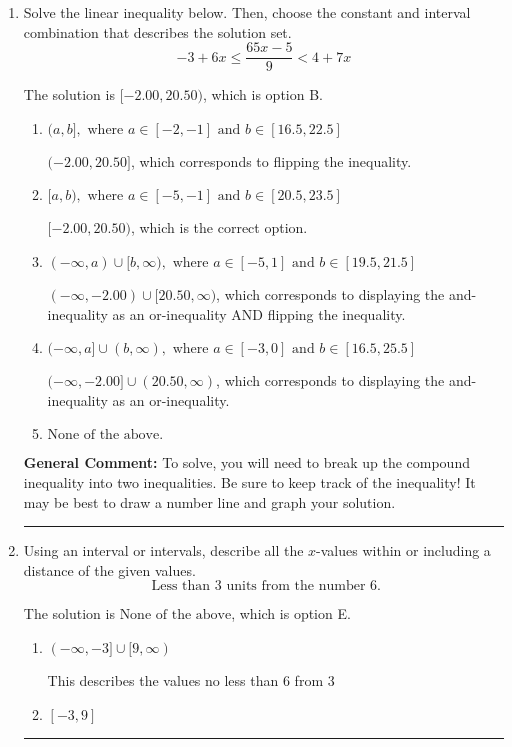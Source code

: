\documentclass{extbook}[14pt]
\newcommand{\litem}[1]{\item #1

\rule{\textwidth}{0.4pt}}
\begin{document}
\begin{enumerate}
{\begin{enumerate}[label=\Alph*.]
Corresponds to the variable canceling, which does not happen in this instance.
\end{enumerate}

\textbf{General Comment:} When multiplying or dividing by a negative, flip the sign.
}
\litem{
Solve the linear inequality below. Then, choose the constant and interval combination that describes the solution set.
\[ -3 + 6 x \leq \frac{65 x - 5}{9} < 4 + 7 x \]

The solution is \( [-2.00, 20.50) \), which is option B.\begin{enumerate}[label=\Alph*.]
\item \( (a, b], \text{ where } a \in [-2, -1] \text{ and } b \in [16.5, 22.5] \)

$(-2.00, 20.50]$, which corresponds to flipping the inequality.
\item \( [a, b), \text{ where } a \in [-5, -1] \text{ and } b \in [20.5, 23.5] \)

$[-2.00, 20.50)$, which is the correct option.
\item \( (-\infty, a) \cup [b, \infty), \text{ where } a \in [-5, 1] \text{ and } b \in [19.5, 21.5] \)

$(-\infty, -2.00) \cup [20.50, \infty)$, which corresponds to displaying the and-inequality as an or-inequality AND flipping the inequality.
\item \( (-\infty, a] \cup (b, \infty), \text{ where } a \in [-3, 0] \text{ and } b \in [16.5, 25.5] \)

$(-\infty, -2.00] \cup (20.50, \infty)$, which corresponds to displaying the and-inequality as an or-inequality.
\item \( \text{None of the above.} \)


\end{enumerate}

\textbf{General Comment:} To solve, you will need to break up the compound inequality into two inequalities. Be sure to keep track of the inequality! It may be best to draw a number line and graph your solution.
}
\litem{
Using an interval or intervals, describe all the $x$-values within or including a distance of the given values.
\[ \text{ Less than } 3 \text{ units from the number } 6. \]

The solution is \( \text{None of the above} \), which is option E.\begin{enumerate}[label=\Alph*.]
\item \( (-\infty, -3] \cup [9, \infty) \)

This describes the values no less than 6 from 3
\item \( [-3, 9] \)


\end{enumerate}}
\end{enumerate}
\end{document}
